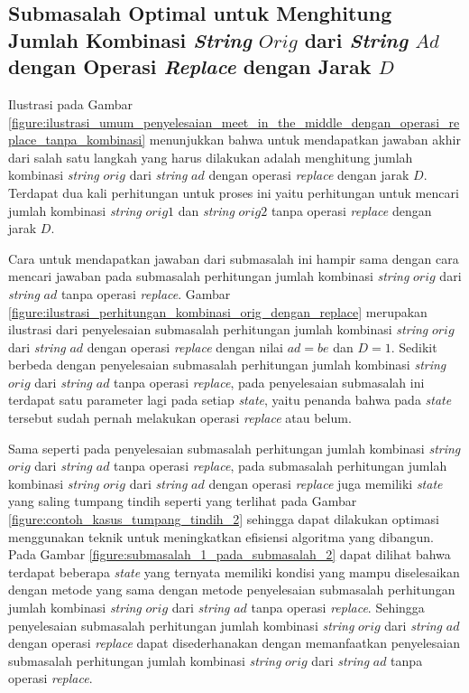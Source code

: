 \subsection{Submasalah Optimal untuk Menghitung Jumlah Kombinasi \textit{String} $ Orig $ dari \textit{String} $ Ad $ dengan Operasi \textit{Replace} dengan Jarak $D$}
\label{subsec:submasalah_optimal_untuk_menghitung_jumlah_kombinasi_string_orig_dari_string_ad_dengan_operasi_replace}

Ilustrasi pada Gambar \ref{figure:ilustrasi_umum_penyelesaian_meet_in_the_middle_dengan_operasi_replace_tanpa_kombinasi} menunjukkan bahwa untuk mendapatkan jawaban akhir dari \problem{} salah satu langkah yang harus dilakukan adalah menghitung jumlah kombinasi \textit{string} $ orig $ dari \textit{string} $ ad $ dengan operasi \textit{replace} dengan jarak $ D $. Terdapat dua kali perhitungan untuk proses ini yaitu perhitungan untuk mencari jumlah kombinasi \textit{string} $ orig1 $ dan \textit{string} $ orig2 $ tanpa operasi \textit{replace} dengan jarak $ D $.

Cara untuk mendapatkan jawaban dari submasalah ini hampir sama dengan cara mencari jawaban pada submasalah perhitungan jumlah kombinasi \textit{string} $ orig $ dari \textit{string} $ ad $ tanpa operasi \textit{replace}. Gambar \ref{figure:ilustrasi_perhitungan_kombinasi_orig_dengan_replace} merupakan ilustrasi dari penyelesaian submasalah perhitungan jumlah kombinasi \textit{string} $ orig $ dari \textit{string} $ ad $ dengan operasi \textit{replace} dengan nilai $ ad=be $ dan $ D=1 $. Sedikit berbeda dengan penyelesaian submasalah perhitungan jumlah kombinasi \textit{string} $ orig $ dari \textit{string} $ ad $ tanpa operasi \textit{replace}, pada penyelesaian submasalah ini terdapat satu parameter lagi pada setiap \textit{state}, yaitu penanda bahwa pada \textit{state} tersebut sudah pernah melakukan operasi \textit{replace} atau belum.

Sama seperti pada penyelesaian submasalah perhitungan jumlah kombinasi \textit{string} $ orig $ dari \textit{string} $ ad $ tanpa operasi \textit{replace}, pada submasalah perhitungan jumlah kombinasi \textit{string} $ orig $ dari \textit{string} $ ad $ dengan operasi \textit{replace} juga memiliki \textit{state} yang saling tumpang tindih seperti yang terlihat pada Gambar \ref{figure:contoh_kasus_tumpang_tindih_2} sehingga dapat dilakukan optimasi menggunakan teknik \dynamicprogramming{} untuk meningkatkan efisiensi algoritma yang dibangun. Pada Gambar \ref{figure:submasalah_1_pada_submasalah_2} dapat dilihat bahwa terdapat beberapa \textit{state} yang ternyata memiliki kondisi yang mampu diselesaikan dengan metode yang sama dengan metode penyelesaian submasalah perhitungan jumlah kombinasi \textit{string} $ orig $ dari \textit{string} $ ad $ tanpa operasi \textit{replace}. Sehingga penyelesaian submasalah perhitungan jumlah kombinasi \textit{string} $ orig $ dari \textit{string} $ ad $ dengan operasi \textit{replace} dapat disederhanakan dengan memanfaatkan penyelesaian submasalah perhitungan jumlah kombinasi \textit{string} $ orig $ dari \textit{string} $ ad $ tanpa operasi \textit{replace}.

